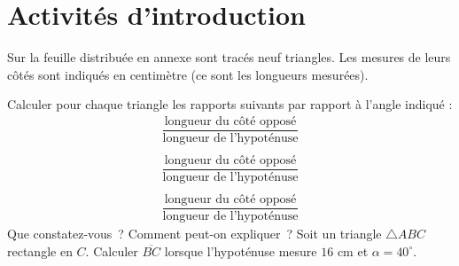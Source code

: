 \documentclass[a4paper,12pt]{article}
\begin{document}
\section{Activités d'introduction}

\begin{activite}
	\tcblower
Sur la feuille distribuée en annexe sont tracés neuf triangles. Les mesures de leurs côtés sont indiqués en centimètre (ce sont les longueurs mesurées). 
\begin{tasks}
\task Calculer pour chaque triangle les rapports suivants par rapport à l'angle indiqué : 
\begin{gather*}
	\dfrac{\text{longueur du côté opposé}}{\text{longueur de l'hypoténuse}}\\\\
	\dfrac{\text{longueur du côté opposé}}{\text{longueur de l'hypoténuse}}\\\\
	\dfrac{\text{longueur du côté opposé}}{\text{longueur de l'hypoténuse}}
\end{gather*}
\task Que constatez-vous~? Comment peut-on expliquer~?
\task Soit un triangle $\triangle ABC$ rectangle en $C$. Calculer $\overline{BC}$ lorsque l'hypoténuse mesure $16$ cm et $\alpha=40^\circ$.
\end{tasks}
\end{activite}
\end{document}
